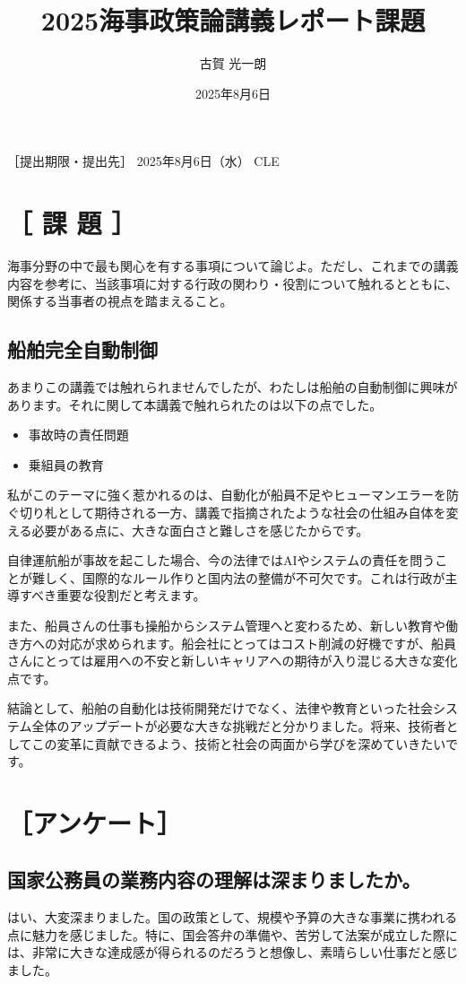 \documentclass[dvipdfmx,a4paper]{jsarticle}
\title{2025海事政策論講義レポート課題}
\author{古賀 光一朗}
\date{2025年8月6日}
\begin{document}
\maketitle
［提出期限・提出先］
2025年8月6日（水）
CLE

\section{［ 課 題 ］}
海事分野の中で最も関心を有する事項について論じよ。ただし、これまでの講義内容を参考に、当該事項に対する行政の関わり・役割について触れるとともに、関係する当事者の視点を踏まえること。

\subsection{船舶完全自動制御}

あまりこの講義では触れられませんでしたが、わたしは船舶の自動制御に興味があります。それに関して本講義で触れられたのは以下の点でした。
\begin{itemize}
\item 事故時の責任問題
\item 乗組員の教育
\end{itemize}

私がこのテーマに強く惹かれるのは、自動化が船員不足やヒューマンエラーを防ぐ切り札として期待される一方、講義で指摘されたような社会の仕組み自体を変える必要がある点に、大きな面白さと難しさを感じたからです。

自律運航船が事故を起こした場合、今の法律ではAIやシステムの責任を問うことが難しく、国際的なルール作りと国内法の整備が不可欠です。これは行政が主導すべき重要な役割だと考えます。

また、船員さんの仕事も操船からシステム管理へと変わるため、新しい教育や働き方への対応が求められます。船会社にとってはコスト削減の好機ですが、船員さんにとっては雇用への不安と新しいキャリアへの期待が入り混じる大きな変化点です。

結論として、船舶の自動化は技術開発だけでなく、法律や教育といった社会システム全体のアップデートが必要な大きな挑戦だと分かりました。将来、技術者としてこの変革に貢献できるよう、技術と社会の両面から学びを深めていきたいです。


\section{［アンケート］}
\subsection{国家公務員の業務内容の理解は深まりましたか。}
はい、大変深まりました。国の政策として、規模や予算の大きな事業に携われる点に魅力を感じました。特に、国会答弁の準備や、苦労して法案が成立した際には、非常に大きな達成感が得られるのだろうと想像し、素晴らしい仕事だと感じました。
\end{document}
